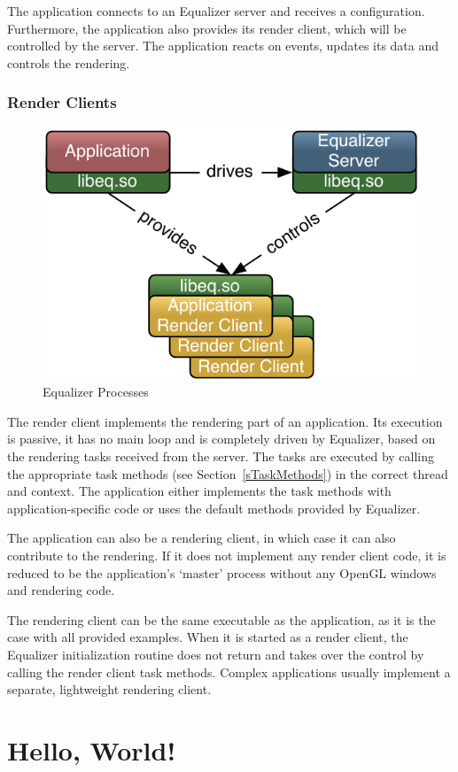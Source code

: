 \documentclass[10pt,a4]{scrartcl}
\newcommand{\sref}[1]{Section~\ref{#1}}
\begin{document}
The application connects to an Equalizer server and receives a
configuration.  Furthermore, the application also provides its render
client, which will be controlled by the server. The application reacts
on events, updates its data and controls the rendering.

\subsubsection{Render Clients}

\begin{figure}
  \includegraphics[width=.618\textwidth]{images/processes.pdf}
  {\caption{\label{fProcesses}Equalizer Processes}}
\end{figure}
The render client implements the rendering part of an application. Its
execution is passive, it has no main loop and is completely driven by
Equalizer, based on the rendering tasks received from the server. The
tasks are executed by calling the appropriate task methods (see
\sref{sTaskMethods}) in the correct thread and context. The application
either implements the task methods with application-specific code or
uses the default methods provided by Equalizer.

The application can also be a rendering client, in which case it can
also contribute to the rendering. If it does not implement any render
client code, it is reduced to be the application's `master' process
without any OpenGL windows and rendering code.

The rendering client can be the same executable as the application, as
it is the case with all provided examples. When it is started as a
render client, the Equalizer initialization routine does not return and
takes over the control by calling the render client task
methods. Complex applications usually implement a separate, lightweight
rendering client.


\section{Hello, World!}
\end{document}

